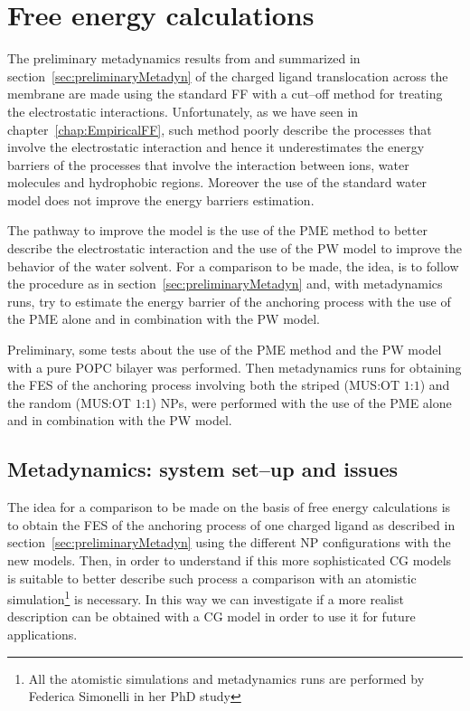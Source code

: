 \chapter{Free energy calculations}
The preliminary metadynamics results from \cite{ourPaper} and summarized in section~\ref{sec:preliminaryMetadyn} of the charged ligand translocation across the membrane are made using the standard \martini \ac{FF} with a cut--off method for treating the electrostatic interactions. Unfortunately, as we have seen in chapter~\ref{chap:EmpiricalFF}, such method poorly describe the processes that involve the electrostatic interaction and hence it underestimates the energy barriers of the processes that involve the interaction between ions, water molecules and hydrophobic regions. Moreover the use of the standard \martini water model does not improve the energy barriers estimation.

The pathway to improve the model is the use of the \ac{PME} method to better describe the electrostatic interaction and the use of the \ac{PW} model to improve the behavior of the water solvent. For a comparison to be made, the idea, is to follow the procedure as in section~\ref{sec:preliminaryMetadyn} and, with metadynamics runs, try to estimate the energy barrier of the anchoring process with the use of the \ac{PME} alone and in combination with the \ac{PW} model. 

Preliminary, some tests about the use of the \ac{PME} method and the \ac{PW} model with a pure \ac{POPC} bilayer was performed. Then metadynamics runs for obtaining the \ac{FES} of the anchoring process involving both the striped (\ac{MUS}:\ac{OT} $1$:$1$) and the random (\ac{MUS}:\ac{OT} $1$:$1$) \acp{NP}, were performed with the use of the \ac{PME} alone and in combination with the \ac{PW} model. 

\section{Metadynamics: system set--up and issues}
The idea for a comparison to be made on the basis of free energy calculations is to obtain the \ac{FES} of the anchoring process of one charged ligand as described in section~\ref{sec:preliminaryMetadyn} using the different \ac{NP} configurations with the new \martini models. Then, in order to understand if this more sophisticated \ac{CG} models is suitable to better describe such process a comparison with an atomistic simulation\footnote{All the atomistic simulations and metadynamics runs are performed by Federica Simonelli in her PhD study} is necessary. In this way we can investigate if a more realist description can be obtained with a \ac{CG} model in order to use it for future applications.

